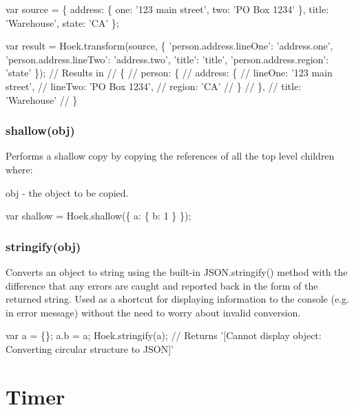 \begin{DoxyCode}
var source = \{
    address: \{
        one: '123 main street',
        two: 'PO Box 1234'
    \},
    title: 'Warehouse',
    state: 'CA'
\};

var result = Hoek.transform(source, \{
    'person.address.lineOne': 'address.one',
    'person.address.lineTwo': 'address.two',
    'title': 'title',
    'person.address.region': 'state'
\});
// Results in
// \{
//     person: \{
//         address: \{
//             lineOne: '123 main street',
//             lineTwo: 'PO Box 1234',
//             region: 'CA'
//         \}
//     \},
//     title: 'Warehouse'
// \}
\end{DoxyCode}


\subsubsection*{shallow(obj)}

Performs a shallow copy by copying the references of all the top level children where\+:
\begin{DoxyItemize}
\item {\ttfamily obj} -\/ the object to be copied.
\end{DoxyItemize}


\begin{DoxyCode}
var shallow = Hoek.shallow(\{ a: \{ b: 1 \} \});
\end{DoxyCode}


\subsubsection*{stringify(obj)}

Converts an object to string using the built-\/in {\ttfamily J\+S\+O\+N.\+stringify()} method with the difference that any errors are caught and reported back in the form of the returned string. Used as a shortcut for displaying information to the console (e.\+g. in error message) without the need to worry about invalid conversion.


\begin{DoxyCode}
var a = \{\};
a.b = a;
Hoek.stringify(a);      // Returns '[Cannot display object: Converting circular structure to JSON]'
\end{DoxyCode}


\section*{Timer}

